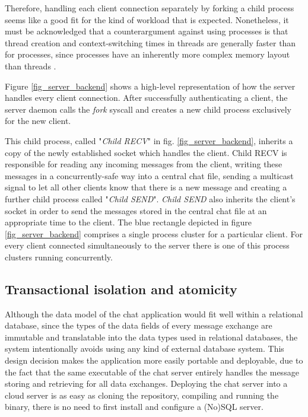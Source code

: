Therefore, handling each client connection separately by forking a child process seems like a good fit for the kind of workload that is expected. Nonetheless, it must be acknowledged that a counterargument against using processes is that thread creation and context-switching times in threads are generally faster than for processes, since processes have an inherently more complex memory layout than threads \cite{Kerrisk2010}.

Figure \ref{fig_server_backend} shows a high-level representation of how the server handles every client connection. After successfully authenticating a client, the server daemon calls the \textit{fork} syscall and creates a new child process exclusively for the new client.
 
This child process, called "\textit{Child RECV}" in fig. \ref{fig_server_backend}, inherits a copy of the newly established socket which handles the client. Child RECV is responsible for reading any incoming messages from the client, writing these messages in a concurrently-safe way into a central chat file, sending a multicast signal to let all other clients know that there is a new message and creating a further child process called "\textit{Child SEND}". \textit{Child SEND} also inherits the client's socket in order to send the messages stored in the central chat file at an appropriate time to the client. The blue rectangle depicted in figure \ref{fig_server_backend} comprises a single process cluster for a particular client. For every client connected simultaneously to the server there is one of this process clusters running concurrently.

\subsection{Transactional isolation and atomicity}
Although the data model of the chat application would fit well within a relational database, since the types of the data fields of every message exchange are immutable and translatable into the data types used in relational databases, the system intentionally avoids using any kind of external database system. This design decision makes the application more easily portable and deployable, due to the fact that the same executable of the chat server entirely handles the message storing and retrieving for all data exchanges. Deploying the chat server into a cloud server is as easy as cloning the repository, compiling and running the binary, there is no need to first install and configure a (No)SQL server.

